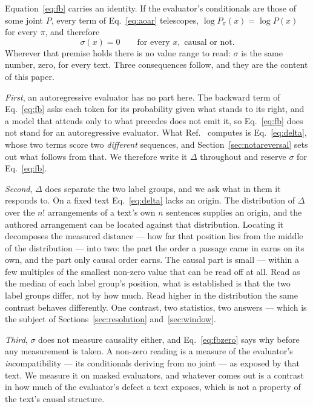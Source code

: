 Equation~\eqref{eq:fb} carries an identity.  If the evaluator's
conditionals are those of some joint $P$, every term of
Eq.~\eqref{eq:aoar} telescopes, $\log P_\pi(x) = \log P(x)$ for every
$\pi$, and therefore
\begin{equation}
\sigma(x) = 0 \qquad \text{for every } x, \text{ causal or not.}
\label{eq:fbzero}
\end{equation}
Wherever that premise holds there is no value range to read: $\sigma$ is
the same number, zero, for every text.  Three consequences follow, and they
are the content of this paper.

\emph{First}, an autoregressive evaluator has no part here.  The backward
term of Eq.~\eqref{eq:fb} asks each token for its probability given what
stands to its right, and a model that attends only to what precedes does not
emit it, so Eq.~\eqref{eq:fb} does not stand for an autoregressive
evaluator.  What Ref.~\cite{sagawa2026} computes is Eq.~\eqref{eq:delta},
whose two terms score two \emph{different} sequences, and
Section~\ref{sec:notareversal} sets out what follows from that.  We
therefore write it $\Delta$ throughout and reserve $\sigma$ for
Eq.~\eqref{eq:fb}.

\emph{Second}, $\Delta$ does separate the two label groups, and we ask what in them it responds to.  On a fixed text
Eq.~\eqref{eq:delta} lacks an origin.  The distribution of $\Delta$ over the
$n!$ arrangements of a text's own $n$ sentences supplies an origin, and the
authored arrangement can be located against that distribution.  Locating it
decomposes the measured distance --- how far that position lies from the
middle of the distribution --- into two: the part the order a passage came
in earns on its own, and the part only causal order earns.  The causal part
is small --- within a few multiples of the smallest non-zero value that can
be read off at all.  Read as the median of each label group's
position, what is established is that the two label groups differ, not by
how much.  Read higher in the distribution the same contrast behaves
differently.  One contrast, two statistics, two answers --- which is the
subject of Sections~\ref{sec:resolution} and~\ref{sec:window}.

\emph{Third}, $\sigma$ does not measure causality either, and
Eq.~\eqref{eq:fbzero} says why before any measurement is taken.  A non-zero
reading is a measure of the evaluator's \emph{in}compatibility --- its
conditionals deriving from no joint --- as exposed by that text.  We
measure it on masked evaluators, and whatever comes out is a contrast in how
much of the evaluator's defect a text exposes, which is not a property of
the text's causal structure.

